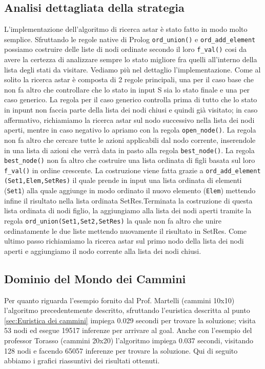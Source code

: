 \subsection{Analisi dettagliata della strategia}

L'implementazione dell'algoritmo di ricerca astar è stato fatto in modo molto semplice. Sfruttando le regole native di Prolog \lstinline{ord_union()} e \lstinline{ord_add_element} possiamo costruire delle liste di nodi ordinate secondo il loro \lstinline{f_val()} cosi da avere la certezza di analizzare sempre lo stato migliore fra quelli all'interno della lista degli stati da visitare. Vediamo più nel dettaglio l'implementazione. Come al solito la ricerca astar è composta di 2 regole principali, una per il caso base che non fa altro che controllare che lo stato in input S sia lo stato finale e una per caso generico. La regola per il caso generico controlla prima di tutto che lo stato in inpunt non faccia parte della lista dei nodi chiusi e quindi già visitato; in caso affermativo, richiamiamo la ricerca astar sul nodo successivo nella lista dei nodi aperti, mentre in caso negativo lo apriamo con la regola \lstinline{open_node()}. La regola non fa altro che cercare tutte le azioni applicabili dal nodo corrente, inserendole in una lista di azioni che verrà data in pasto alla regola \lstinline{best_node()}. La regola \lstinline{best_node()} non fa altro che costruire una lista ordinata di figli basata sul loro \lstinline{f_val()} in ordine crescente.
La costruzione viene fatta grazie a \lstinline{ord_add_element (Set1,Elem,SetRes)} il quale prende in input una lista ordinata di elementi (\lstinline{Set1}) alla quale aggiunge in modo ordinato il nuovo elemento (\lstinline{Elem}) mettendo infine il risultato nella lista ordinata SetRes.Terminata la costruzione di questa lista ordinata di nodi figlio, la aggiungiamo alla lista dei nodi aperti tramite la regola \lstinline{ord_union(Set1,Set2,SetRes)} la quale non fa altro che unire ordinatamente le due liste mettendo nuovamente il risultato in SetRes.
Come ultimo passo richiamiamo la ricerca astar sul primo nodo della lista dei nodi aperti e aggiungiamo il nodo corrente alla lista dei nodi chiusi.

\subsection{Dominio del Mondo dei Cammini}
Per quanto riguarda l'esempio fornito dal Prof. Martelli (cammini 10x10) l'algoritmo precedentemente descritto, sfruttando l'euristica descritta al punto \ref{sec:Euristica dei cammini} impiega 0.029 secondi per trovare la soluzione; visita 53 nodi ed esegue 19517 inferenze per arrivare al goal. Anche con l'esempio del professor Torasso (cammini 20x20) l'algoritmo impiega 0.037 secondi, visitando 128 nodi e facendo 65057 inferenze per trovare la soluzione.
Qui di seguito abbiamo i grafici riassuntivi dei risultati ottenuti.

